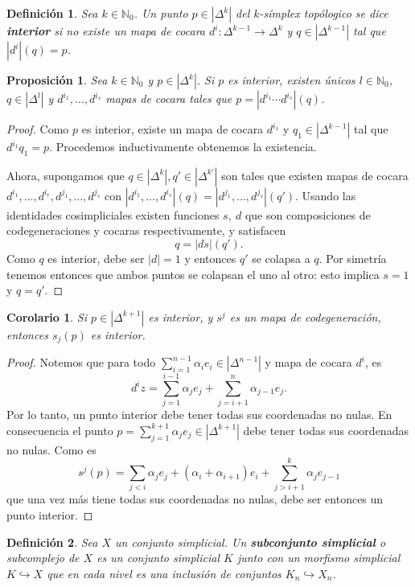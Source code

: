 \documentclass[11pt]{report}
\theoremstyle{colored}
\newtheorem{definition}{Definición}[section]
\newtheorem{proposition}{Proposición}[section]
\newtheorem{corollary}{Corolario}[section]
\newcommand{\N}{\mathbb{N}}
\renewcommand{\ss}[1]{\Delta^{#1}}
\begin{document}
\begin{definition} Sea $k \in \N_0$. Un punto $p \in |\ss{k}|$ del $k$-símplex topólogico se dice \textbf{interior} si no existe un mapa de cocara $d^i : \ss{k-1} \to \ss{k}$ y $q \in |\ss{k-1}|$ tal que $|d^i|(q) = p$.
\end{definition}

\begin{proposition} Sea $k \in \N_0$ y $p \in |\ss{k}|$. Si $p$ es interior, existen únicos $l \in \N_0$, $q \in |\ss{l}|$ y $d^{i_1}, \dots, d^{i_s}$ mapas de cocara tales que $p = |d^{i_1} \cdots d^{i_s}|(q)$.
\end{proposition}
\begin{proof} Como $p$ es interior, existe un mapa de cocara $d^{i_1}$ y $q_1 \in |\Delta^{k-1}|$ tal que $d^{i_1}q_1 = p$. Procedemos inductivamente obtenemos la existencia. 

Ahora, supongamos que $q \in |\ss{k}|,q'\in|\ss{k'}|$ son tales que existen mapas de cocara $d^{i_1}, \dots, d^{i_r},d^{j_1}, \dots, d^{j_s}$ con $|d^{i_1}, \dots, d^{i_s}|(q) = |d^{j_1}, \dots, d^{j_s}|(q')$. Usando las identidades cosimpliciales existen funciones $s, \ d$ que son composiciones de codegeneraciones y cocaras respectivamente, y satisfacen
\[
q = |ds|(q').
\]
Como $q$ es interior, debe ser $|d| = 1$ y entonces $q'$ se colapsa a $q$. Por simetría tenemos entonces que ambos puntos se colapsan el uno al otro: esto implica $s = 1$ y $q  = q'$.
\end{proof}

\begin{corollary} Si $p \in |\ss{k+1}|$ es interior, y $s^j$ es un mapa de codegeneración, entonces $s_j(p)$ es interior. 
\end{corollary}
\begin{proof} Notemos que para todo $\sum_{i=1}^{n-1}\alpha_ ie_i \in |\ss{n-1}|$ y mapa de cocara $d^i$, es 
\[
d^iz= \sum_{j=1}^{i-1}\alpha_j e_j + \sum_{j = i+1}^{n}\alpha_{j-1} e_j.
\]
Por lo tanto, un punto interior debe tener todas sus coordenadas no nulas. En consecuencia el punto $p = \sum_{j=1}^{k+1}\alpha_je_j \in |\ss{k+1}|$ debe tener todas sus coordenadas no nulas. Como es
\[
s^j(p) = \sum_{j < i}\alpha_j e_j + (\alpha_i+\alpha_{i+1})e_i + \sum_{j > i+1}^k \alpha_{j}e_{j-1}
\]
que una vez más tiene todas sus coordenadas no nulas, debe ser entonces un punto interior.
\end{proof}

\begin{definition} Sea $X$ un conjunto simplicial. Un \textbf{subconjunto simplicial} o subcomplejo de $X$ es un conjunto simplicial $K$ junto con un morfismo simplicial $K \hookrightarrow X$ que en cada nivel es una inclusión de conjuntos $K_n \hookrightarrow X_n$.
\end{definition}
\end{document}
